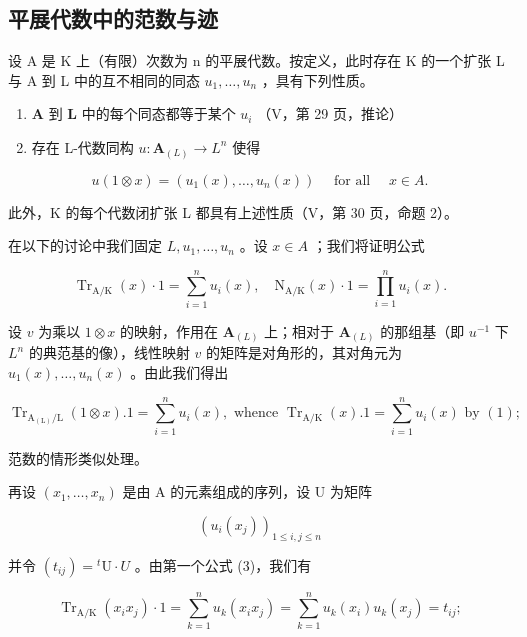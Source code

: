 \subsection{平展代数中的范数与迹}

设 A 是 K 上（有限）次数为 n 的平展代数。按定义，此时存在 K 的一个扩张 L 与 A 到 L 中的互不相同的同态 \(u_{1}, \ldots, u_{n}\) ，具有下列性质。

\begin{enumerate}
\def\labelenumi{\alph{enumi})}
\item
  \(\mathbf{A}\) 到 \(\mathbf{L}\) 中的每个同态都等于某个 \(u_{i}\) （V，第 29 页，推论）
\item
  存在 L-代数同构 \(u: \mathbf{A}_{(L)} \to L^n\) 使得
\end{enumerate}

\[
u (1 \otimes x) = \left(u _ {1} (x), \dots , u _ {n} (x)\right) \quad \text { for   all } \quad x \in A.
\]

此外，K 的每个代数闭扩张 L 都具有上述性质（V，第 30 页，命题 2）。

在以下的讨论中我们固定 \(L, u_1, \ldots, u_n\) 。设 \(x \in A\) ；我们将证明公式

\[
\operatorname{Tr} _ {\mathrm{A} / \mathrm{K}} (x) \cdot 1 = \sum_ {i = 1} ^ {n} u _ {i} (x), \quad \mathrm{N} _ {\mathrm{A} / \mathrm{K}} (x) \cdot 1 = \prod_ {i = 1} ^ {n} u _ {i} (x).\tag{3}
\]

设 \(v\) 为乘以 \(1 \otimes x\) 的映射，作用在 \(\mathbf{A}_{(L)}\) 上；相对于 \(\mathbf{A}_{(L)}\) 的那组基（即 \(u^{-1}\) 下 \(L^n\) 的典范基的像），线性映射 \(v\) 的矩阵是对角形的，其对角元为 \(u_1(x), \ldots, u_n(x)\) 。由此我们得出

\[
\operatorname{Tr} _ {\mathrm{A} _ {(\mathrm{L})} / \mathrm{L}} (1 \otimes x). 1 = \sum_ {i = 1} ^ {n} u _ {i} (x), \text { whence } \operatorname{Tr} _ {\mathrm{A} / \mathrm{K}} (x). 1 = \sum_ {i = 1} ^ {n} u _ {i} (x) \text { by } (1);
\]

范数的情形类似处理。

再设 \((x_{1},\ldots ,x_{n})\) 是由 A 的元素组成的序列，设 U 为矩阵

\[
\left(u _ {i} \left(x _ {j}\right)\right) _ {1 \leqslant i, j \leqslant n}
\]

并令 \((t_{ij}) = {}^t\mathrm{U} \cdot U\) 。由第一个公式 (3)，我们有

\[
\operatorname{Tr} _ {\mathrm{A} / \mathrm{K}} \left(x _ {i} x _ {j}\right) \cdot 1 = \sum_ {k = 1} ^ {n} u _ {k} \left(x _ {i} x _ {j}\right) = \sum_ {k = 1} ^ {n} u _ {k} \left(x _ {i}\right) u _ {k} \left(x _ {j}\right) = t _ {i j};
\]

